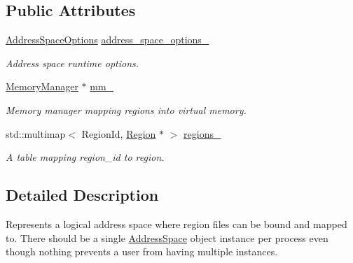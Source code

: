 \subsection*{Public Attributes}
\begin{DoxyCompactItemize}
\item 
\hyperlink{structalps_1_1AddressSpaceOptions}{Address\+Space\+Options} \hyperlink{classalps_1_1AddressSpace_ae41a0caf654a278553e05427538cd377}{address\+\_\+space\+\_\+options\+\_\+}\hypertarget{classalps_1_1AddressSpace_ae41a0caf654a278553e05427538cd377}{}\label{classalps_1_1AddressSpace_ae41a0caf654a278553e05427538cd377}

\begin{DoxyCompactList}\small\item\em Address space runtime options. \end{DoxyCompactList}\item 
\hyperlink{classalps_1_1MemoryManager}{Memory\+Manager} $\ast$ \hyperlink{classalps_1_1AddressSpace_ab4e162ae17ddc0c15873e910c075169d}{mm\+\_\+}\hypertarget{classalps_1_1AddressSpace_ab4e162ae17ddc0c15873e910c075169d}{}\label{classalps_1_1AddressSpace_ab4e162ae17ddc0c15873e910c075169d}

\begin{DoxyCompactList}\small\item\em Memory manager mapping regions into virtual memory. \end{DoxyCompactList}\item 
std\+::multimap$<$ Region\+Id, \hyperlink{classalps_1_1Region}{Region} $\ast$ $>$ \hyperlink{classalps_1_1AddressSpace_a6cba6ed6bb0ffee7682fc665b4eaa035}{regions\+\_\+}\hypertarget{classalps_1_1AddressSpace_a6cba6ed6bb0ffee7682fc665b4eaa035}{}\label{classalps_1_1AddressSpace_a6cba6ed6bb0ffee7682fc665b4eaa035}

\begin{DoxyCompactList}\small\item\em A table mapping region\+\_\+id to region. \end{DoxyCompactList}\end{DoxyCompactItemize}


\subsection{Detailed Description}
Represents a logical address space where region files can be bound and mapped to. There should be a single \hyperlink{classalps_1_1AddressSpace}{Address\+Space} object instance per process even though nothing prevents a user from having multiple instances.

